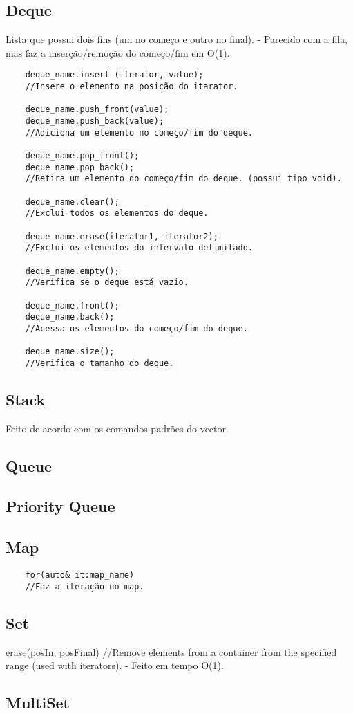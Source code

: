 \subsection{Deque}
    Lista que possui dois fins (um no começo e outro no final).
    - Parecido com a fila, mas faz a inserção/remoção do começo/fim em O(1).
\begin{verbatim}
    deque_name.insert (iterator, value);
    //Insere o elemento na posição do itarator.

    deque_name.push_front(value);
    deque_name.push_back(value);
    //Adiciona um elemento no começo/fim do deque.

    deque_name.pop_front();
    deque_name.pop_back();
    //Retira um elemento do começo/fim do deque. (possui tipo void).

    deque_name.clear();
    //Exclui todos os elementos do deque.

    deque_name.erase(iterator1, iterator2);
    //Exclui os elementos do intervalo delimitado.

    deque_name.empty();
    //Verifica se o deque está vazio.

    deque_name.front();
    deque_name.back();
    //Acessa os elementos do começo/fim do deque.

    deque_name.size();
    //Verifica o tamanho do deque.
\end{verbatim}

\subsection{Stack}
    Feito de acordo com os comandos padrões do vector.

\subsection{Queue}

\subsection{Priority Queue}

\subsection{Map}
\begin{verbatim}
    for(auto& it:map_name)
    //Faz a iteração no map.
\end{verbatim}

\subsection{Set}    
    erase(posIn, posFinal) 
    //Remove elements from a container from the specified range (used with iterators).
    - Feito em tempo O(1).

\subsection{MultiSet} 

\pagebreak